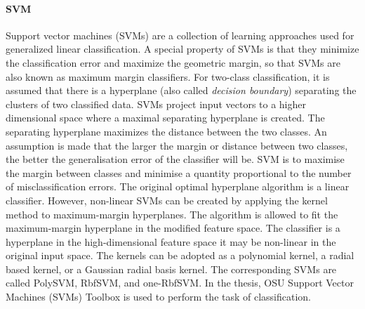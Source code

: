 \paragraph{SVM}
Support vector machines (SVMs) are a collection of learning approaches used for generalized linear classification. A special property of SVMs is that they minimize the classification error and maximize the geometric margin, so that SVMs are also known as maximum margin classifiers. For two-class classification, it is assumed that there is a hyperplane (also called \textit{decision boundary}) separating the clusters of two classified data. SVMs project input vectors to a higher dimensional space where a maximal separating hyperplane is created. The separating hyperplane maximizes the distance between the two classes. An assumption is made that the larger the margin or distance between two classes, the better the generalisation error of the classifier will be. SVM is to maximise the margin between classes and minimise a quantity proportional to the number of misclassification errors. The original optimal hyperplane algorithm is a linear classifier. However,  non-linear SVMs can be created by applying the kernel method \cite{Taylor2004} to maximum-margin hyperplanes. The algorithm is allowed to fit the maximum-margin hyperplane in the modified feature space. The classifier is a hyperplane in the high-dimensional feature space it may be non-linear in the original input space. The kernels can be adopted as a polynomial kernel, a radial based kernel, or a Gaussian radial basis kernel. The corresponding SVMs are called  PolySVM, RbfSVM, and one-RbfSVM. In the thesis, OSU Support Vector Machines (SVMs) Toolbox \cite{Ma2001} is used to perform the task of classification.


